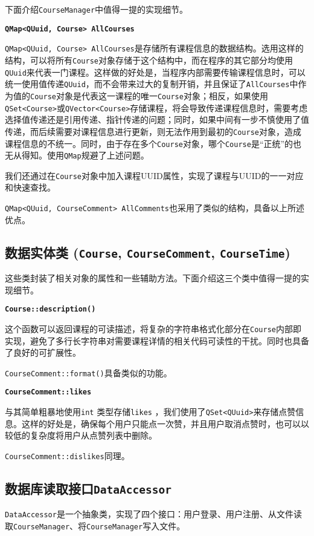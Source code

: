 \documentclass{article}
\begin{document}
下面介绍\texttt{CourseManager}中值得一提的实现细节。

\noindent \textbf{\texttt{QMap<QUuid, Course> AllCourses}}

\texttt{QMap<QUuid, Course> AllCourses}是存储所有课程信息的数据结构。选用这样的结构，可以将所有\texttt{Course}对象存储于这个结构中，而在程序的其它部分均使用\texttt{QUuid}来代表一门课程。这样做的好处是，当程序内部需要传输课程信息时，可以统一使用值传递\texttt{QUuid}，而不会带来过大的复制开销，并且保证了\texttt{AllCourses}中作为值的\texttt{Course}对象是代表这一课程的唯一\texttt{Course}对象；相反，如果使用\texttt{QSet<Course>}或\texttt{QVector<Course>}存储课程，将会导致传递课程信息时，需要考虑选择值传递还是引用传递、指针传递的问题；同时，如果中间有一步不慎使用了值传递，而后续需要对课程信息进行更新，则无法作用到最初的\texttt{Course}对象，造成课程信息的不统一。同时，由于存在多个\texttt{Course}对象，哪个\texttt{Course}是“正统”的也无从得知。使用\texttt{QMap}规避了上述问题。

我们还通过在\texttt{Course}对象中加入课程UUID属性，实现了课程与UUID的一一对应和快速查找。

\texttt{QMap<QUuid, CourseComment> AllComments}也采用了类似的结构，具备以上所述优点。

\subsection{数据实体类 (\texttt{Course}, \texttt{CourseComment}, \texttt{CourseTime})}
这些类封装了相关对象的属性和一些辅助方法。下面介绍这三个类中值得一提的实现细节。

\noindent \textbf{\texttt{Course::description()}}

这个函数可以返回课程的可读描述，将复杂的字符串格式化部分在\texttt{Course}内部即实现，避免了多行长字符串对需要课程详情的相关代码可读性的干扰。同时也具备了良好的可扩展性。

\texttt{CourseComment::format()}具备类似的功能。

\noindent \textbf{\texttt{CourseComment::likes}}

与其简单粗暴地使用\texttt{int} 类型存储\texttt{likes} ，我们使用了\texttt{QSet<QUuid>}来存储点赞信息。这样的好处是，确保每个用户只能点一次赞，并且用户取消点赞时，也可以以较低的复杂度将用户从点赞列表中删除。

\texttt{CourseComment::dislikes}同理。

\subsection{数据库读取接口\texttt{DataAccessor}}
\texttt{DataAccessor}是一个抽象类，实现了四个接口：用户登录、用户注册、从文件读取\texttt{CourseManager}、将\texttt{CourseManager}写入文件。
\end{document}

